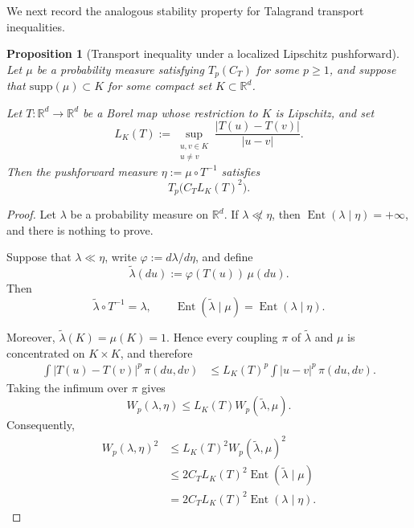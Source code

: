 \documentclass{tsp-short}
\newtheorem{proposition}{Proposition}[section]
\theoremstyle{remark}
\theoremstyle{definition}
\newcommand{\R}{\mathbb{R}} %
\newcommand{\supp}{\mathrm{supp}} %
\DeclareMathOperator{\Ent}{Ent} %
\begin{document}
We next record the analogous stability property for Talagrand transport inequalities.
\begin{proposition}[Transport inequality under a localized Lipschitz pushforward]\label{prop:talagrand-pushforward}
	Let \(\mu\) be a probability measure satisfying \(T_p(C_T)\) for some \(p\ge1\), and suppose that
	\(\supp(\mu)\subset K\) for some compact set \(K\subset\R^d\).

	Let \(T:\R^d\to\R^d\) be a Borel map whose restriction to \(K\) is Lipschitz, and set
	\begin{equation*}
		L_K(T):=\sup_{\substack{u,v\in K\\u\neq v}}\frac{|T(u)-T(v)|}{|u-v|}.
	\end{equation*}
	Then the pushforward measure \(\eta:=\mu\circ T^{-1}\) satisfies
	\begin{equation*}
		T_p\bigl(C_T L_K(T)^2\bigr).
	\end{equation*}
\end{proposition}

\begin{proof}
	Let \(\lambda\) be a probability measure on \(\R^d\).
	If \(\lambda\not\ll\eta\), then
	\(\Ent(\lambda\mid\eta)=+\infty\), and there is nothing to prove.

	Suppose that \(\lambda\ll\eta\), write
	\(\varphi:=d\lambda/d\eta\), and define
	\begin{equation*}
		\widetilde\lambda(du):=\varphi(T(u))\,\mu(du).
	\end{equation*}
	Then
	\begin{equation*}
		\widetilde\lambda\circ T^{-1}=\lambda, \qquad \Ent(\widetilde\lambda\mid\mu)=\Ent(\lambda\mid\eta).
	\end{equation*}

	Moreover,
	\(\widetilde\lambda(K)=\mu(K)=1\). Hence every coupling
	\(\pi\) of \(\widetilde\lambda\) and \(\mu\) is concentrated on
	\(K\times K\), and therefore
	\begin{align*}
		\int|T(u)-T(v)|^p\,\pi(du,dv) & \le L_K(T)^p\int|u-v|^p\,\pi(du,dv).
	\end{align*}
	Taking the infimum over \(\pi\) gives
	\begin{equation*}
		W_p(\lambda,\eta) \le L_K(T)W_p(\widetilde\lambda,\mu).
	\end{equation*}
	Consequently,
	\begin{align*}
		W_p(\lambda,\eta)^2 & \le L_K(T)^2W_p(\widetilde\lambda,\mu)^2       \\
		                    & \le 2C_TL_K(T)^2\Ent(\widetilde\lambda\mid\mu) \\
		                    & = 2C_TL_K(T)^2\Ent(\lambda\mid\eta).
	\end{align*}
\end{proof}
\end{document}
